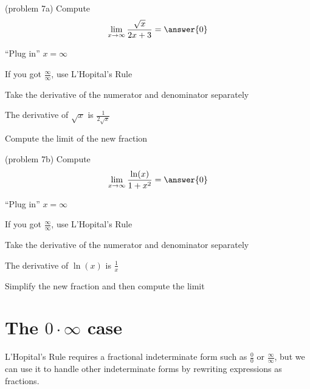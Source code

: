\documentclass{ximera}
\begin{document}
\begin{problem}(problem 7a)
  Compute
  \[
  \lim_{x \to \infty} \frac{\sqrt x}{2x + 3} = \answer{0}
  \]
  
    \begin{hint}
      ``Plug in'' $x=\infty$
    \end{hint}
    \begin{hint}
      If you got $\frac{\infty}{\infty}$, use L'Hopital's Rule
    \end{hint}
    \begin{hint}
      Take the derivative of the numerator and denominator separately
    \end{hint}
		\begin{hint}
		  The derivative of $\sqrt x$ is $\frac{1}{2\sqrt x}$
	  \end{hint}
		\begin{hint}
      Compute the limit of the new fraction
    \end{hint}
	
\end{problem}

\begin{problem}(problem 7b)
  Compute
  \[
  \lim_{x \to \infty} \frac{\ln(x)}{1 + x^2} = \answer{0}
  \]
  
    \begin{hint}
      ``Plug in'' $x=\infty$
    \end{hint}
    \begin{hint}
      If you got $\frac{\infty}{\infty}$, use L'Hopital's Rule
    \end{hint}
    \begin{hint}
      Take the derivative of the numerator and denominator separately
    \end{hint}
		\begin{hint}
		  The derivative of $\ln(x)$ is $\frac{1}{x}$
	  \end{hint}
		\begin{hint}
      Simplify the new fraction and then compute the limit
    \end{hint}
	
\end{problem}


\section{The $0 \cdot \infty$ case}

L'Hopital's Rule requires a fractional indeterminate form such as $\frac00$ or $\frac{\infty}{\infty}$, 
but we can use it to handle other indeterminate forms by rewriting expressions as fractions.
\end{document}
